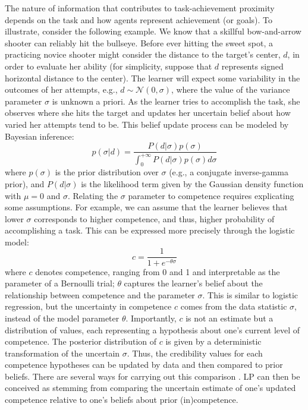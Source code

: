 The nature of information that contributes to task-achievement proximity depends on the task and how agents represent achievement (or goals). To illustrate, consider the following example. We know that a skillful bow-and-arrow shooter can reliably hit the bullseye. Before ever hitting the sweet spot, a practicing novice shooter might consider the distance to the target's center, $d$, in order to evaluate her ability (for simplicity, suppose that $d$ represents signed horizontal distance to the center). The learner will expect some variability in the outcomes of her attempts, e.g., $d \sim \mathcal{N}(0, \sigma)$, where the value of the variance parameter $\sigma$ is unknown a priori. %
As the learner tries to accomplish the task, she observes where she hits the target and updates her uncertain belief about how varied her attempts tend to be. This belief update process can be modeled by Bayesian inference:
\begin{equation}
    p(\sigma|d) = \frac{P(d|\sigma)p(\sigma)}{\int_{0}^{+\infty}P(d|\sigma)p(\sigma)d \sigma}
\end{equation}
where $p(\sigma)$ is the prior distribution over $\sigma$ (e.g., a conjugate inverse-gamma prior), and $P(d|\sigma)$ is the likelihood term given by the Gaussian density function with $\mu=0$ and $\sigma$. Relating the $\sigma$ parameter to competence requires explicating some assumptions. For example, we can assume that the learner believes that lower $\sigma$ corresponds to higher competence, and thus, higher probability of accomplishing a task. This can be expressed more precisely through the logistic model:
\begin{equation}
    c = \frac{1}{1+e^{-\theta \sigma}}
\end{equation}
where $c$ denotes competence, ranging from 0 and 1 and interpretable as the parameter of a Bernoulli trial; $\theta$ captures the learner's belief about the relationship between competence and the parameter $\sigma$. This is similar to logistic regression, but the uncertainty in competence $c$ comes from the data statistic $\sigma$, instead of the model parameter $\theta$. Importantly, $c$ is not an estimate but a distribution of values, each representing a hypothesis about one's current level of competence. The posterior distribution of $c$ is given by a deterministic transformation of the uncertain $\sigma$. Thus, the credibility values for each competence hypotheses can be updated by data and then compared to prior beliefs. There are several ways for carrying out this comparison \parencite[see][]{kruschke_bayesian_2013}. \ac{LP} can then be conceived as stemming from comparing the uncertain estimate of one's updated competence relative to one's beliefs about prior (in)competence. 

